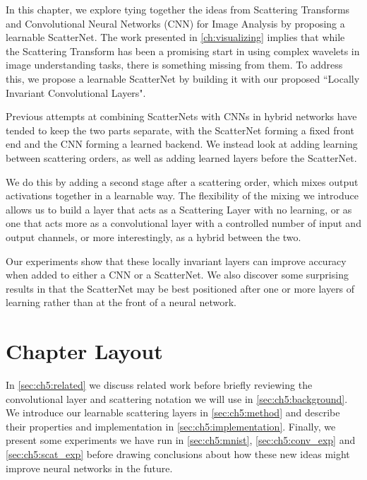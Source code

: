 In this chapter, we explore tying together the ideas from Scattering Transforms
and Convolutional Neural Networks (CNN) for Image Analysis by proposing a learnable
ScatterNet. The work presented in \autoref{ch:visualizing} implies that while the Scattering
Transform has been a promising start in using complex wavelets in image
understanding tasks, there is something missing from them. To address this, we
propose a learnable ScatterNet by building it with our proposed ``Locally Invariant
Convolutional Layers".

Previous attempts at combining ScatterNets with CNNs in hybrid networks
\cite{oyallon_scaling_2017, singh_scatternet_2018} have
tended to keep the two parts separate, with the ScatterNet forming a fixed front
end and the CNN forming a learned backend. We instead look at adding learning
between scattering orders, as well as adding learned layers before the
ScatterNet.

%
We do this by adding a second stage after a scattering order, which mixes output
activations together in a learnable way. The flexibility of the mixing we introduce allows
us to build a layer that acts as a Scattering Layer with no learning, or
as one that acts more as a convolutional layer with a controlled number of input
and output channels, or more interestingly, as a hybrid between the two.

Our experiments show that these locally invariant layers can improve
accuracy when added to either a CNN or a ScatterNet.  We also discover some
surprising results in that the ScatterNet may be best positioned after one or
more layers of learning rather than at the front of a neural network.

\section{Chapter Layout}
In \autoref{sec:ch5:related} we discuss related work before briefly
reviewing the convolutional layer and scattering notation we will use in \autoref{sec:ch5:background}.
We introduce our learnable scattering layers in \autoref{sec:ch5:method} and describe their
properties and implementation in \autoref{sec:ch5:implementation}.
Finally, we present some experiments we have run in \autoref{sec:ch5:mnist},
\autoref{sec:ch5:conv_exp} and \autoref{sec:ch5:scat_exp} before
drawing conclusions about how these new ideas might improve neural networks in the
future.
